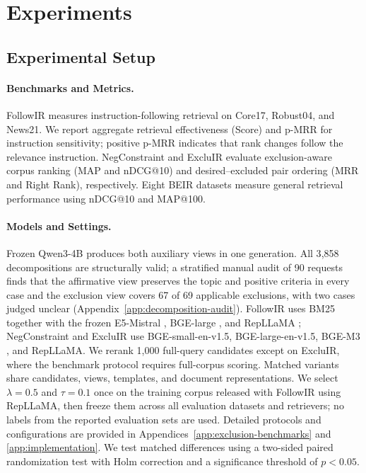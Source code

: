 \documentclass[letterpaper]{article}
\begin{document}
\section{Experiments}
\label{sec:experiments}

\subsection{Experimental Setup}
\label{sec:evaluation-overview}

\paragraph{Benchmarks and Metrics.}
FollowIR \cite{DBLP:conf/naacl/WellerCMLCDLS25} measures
instruction-following retrieval on Core17, Robust04, and News21.  We report
aggregate retrieval effectiveness (Score) and p-MRR for instruction
sensitivity; positive p-MRR indicates that rank changes follow the relevance
instruction.  NegConstraint
\cite{xu2025logical} and ExcluIR
\cite{DBLP:conf/aaai/ZhangZ0PRRCR25} evaluate exclusion-aware corpus ranking
(MAP and nDCG@10) and desired--excluded pair ordering (MRR and Right Rank),
respectively.  Eight BEIR datasets \cite{beir2021} measure general retrieval
performance using nDCG@10 and MAP@100.

\paragraph{Models and Settings.}
Frozen Qwen3-4B \cite{yang2025qwen3} produces both auxiliary views in one
generation.  All 3{,}858 decompositions are structurally valid; a stratified
manual audit of 90 requests finds that the affirmative view preserves the topic
and positive criteria in every case and the exclusion view covers 67 of 69
applicable exclusions, with two cases judged unclear
(Appendix~\ref{app:decomposition-audit}).  FollowIR uses BM25
\cite{DBLP:journals/ftir/RobertsonZ09} together with the frozen E5-Mistral
\cite{DBLP:conf/acl/WangYHYMW24}, BGE-large
\cite{DBLP:conf/sigir/XiaoLZMLN24}, and RepLLaMA
\cite{DBLP:conf/sigir/MaWYWL24}; NegConstraint and ExcluIR use
BGE-small-en-v1.5, BGE-large-en-v1.5, BGE-M3
\cite{DBLP:conf/sigir/XiaoLZMLN24}, and RepLLaMA.
We rerank 1,000 full-query candidates except on ExcluIR, where the benchmark
protocol requires full-corpus scoring.  Matched variants share candidates,
views, templates, and document representations.  We select
$\lambda{=}0.5$ and $\tau{=}0.1$ once on the training corpus released with
FollowIR using RepLLaMA, then freeze them across all evaluation datasets and
retrievers; no labels from the reported evaluation sets are used.  Detailed
protocols and configurations are provided in
Appendices~\ref{app:exclusion-benchmarks} and \ref{app:implementation}.
We test matched differences using a two-sided paired randomization test with
Holm correction and a significance threshold of $p<0.05$.
\end{document}
